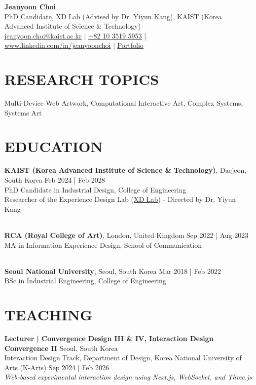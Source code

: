 \documentclass[a4paper,9pt]{extarticle}
\begin{document}
\pagestyle{fancy}
\renewcommand{\headrulewidth}{0pt}
\fancyhead{}
\thispagestyle{empty} %

\begin{flushleft}
\textbf{\LARGE Jeanyoon Choi}\\[2pt] %
PhD Candidate, XD Lab (Advised by Dr. Yiyun Kang), KAIST (Korea Advanced Institute of Science \& Technology)
\\ \href{mailto:jeanyoon.choi@kaist.ac.kr}{jeanyoon.choi@kaist.ac.kr} | \href{tel:01035195953}{+82 10 3519 5953} | \href{https://www.linkedin.com/in/jeanyoonchoi/}{www.linkedin.com/in/jeanyoonchoi} | \href{https://jeanyoon.ch/oi}{Portfolio} %
\end{flushleft}

\section*{RESEARCH TOPICS}
\noindent
Multi-Device Web Artwork, Computational Interactive Art, Complex Systems, Systems Art
\section*{EDUCATION}
\noindent
\textbf{KAIST (Korea Advanced Institute of Science \& Technology)}, Daejeon, South Korea \hfill Feb 2024 | Feb 2028 \\
PhD Candidate in Industrial Design, College of Engineering\\
Researcher of the Experience Design Lab (\href{https://www.xdlab.net/}{XD Lab}) - Directed by Dr. Yiyun Kang

\noindent\\
\textbf{RCA (Royal College of Art)},  London, United Kingdom \hfill Sep 2022 | Aug 2023\\ %
MA in Information Experience Design, School of Communication

\noindent\\
\textbf{Seoul National University},  Seoul, South Korea \hfill Mar 2018 | Feb 2022\\ %
BSc in Industrial Engineering, College of Engineering \\



\section*{TEACHING}
\label{TEACHING}
\noindent
\textbf{Lecturer | Convergence Design III \& IV, Interaction Design Convergence II} \hfill Seoul, South Korea\\ %
{Interaction Design Track, Department of Design, Korea National University of Arts (K-Arts)} \hfill Sep 2024 | Feb 2026 \\
\textit{Web-based experimental interaction design using Next.js, WebSocket, and Three.js} \hfill \\
\end{document}
